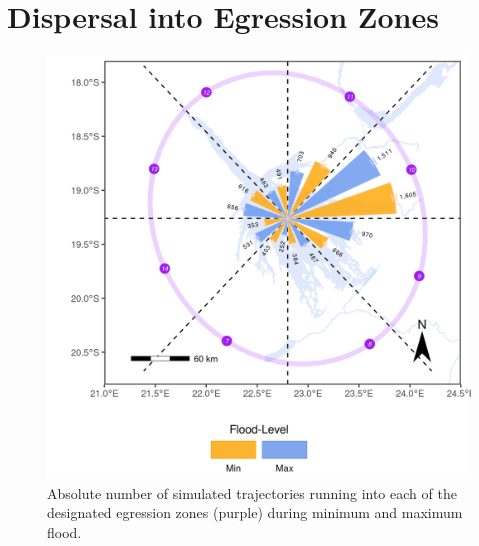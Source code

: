 \documentclass[../FinalThesis.tex]{subfiles}
\begin{document}
\newpage
\section{Dispersal into Egression Zones}
\begin{figure}[!ht]
  \begin{center}
  \includegraphics[width = \textwidth]{Figures/Egression.png}
  \caption{Absolute number of simulated trajectories running into each of the
  designated egression zones (purple) during minimum and maximum flood.}
  \label{Egression}
  \end{center}
\end{figure}

\newpage
\end{document}
